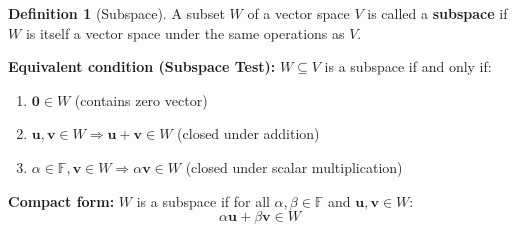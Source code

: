 \documentclass[12pt,a4paper]{article}
\theoremstyle{definition}
\newtheorem{definition}{Definition}[section]
\begin{document}
\begin{definition}[Subspace]
A subset $W$ of a vector space $V$ is called a \textbf{subspace} if $W$ is itself a vector space under the same operations as $V$.

\textbf{Equivalent condition (Subspace Test):}
$W \subseteq V$ is a subspace if and only if:
\begin{enumerate}
    \item $\mathbf{0} \in W$ (contains zero vector)
    \item $\mathbf{u}, \mathbf{v} \in W \Rightarrow \mathbf{u} + \mathbf{v} \in W$ (closed under addition)
    \item $\alpha \in \mathbb{F}, \mathbf{v} \in W \Rightarrow \alpha\mathbf{v} \in W$ (closed under scalar multiplication)
\end{enumerate}

\textbf{Compact form:}
$W$ is a subspace if for all $\alpha, \beta \in \mathbb{F}$ and $\mathbf{u}, \mathbf{v} \in W$:
\begin{equation}
\alpha\mathbf{u} + \beta\mathbf{v} \in W
\end{equation}
\end{definition}
\end{document}
